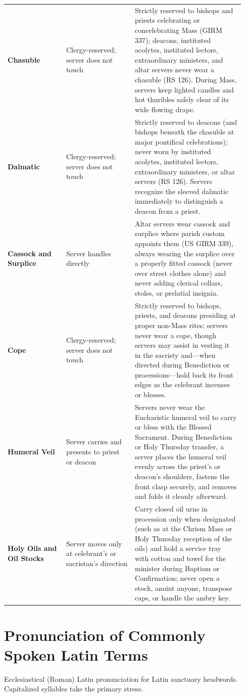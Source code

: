 {\begin{longtable}{>{\raggedright\arraybackslash}p{0.23\linewidth}>{\raggedright\arraybackslash}p{0.27\linewidth}>{\raggedright\arraybackslash}p{0.43\linewidth}}
\textbf{Chasuble} & Clergy-reserved; server does not touch & Strictly reserved to bishops and priests celebrating or concelebrating Mass (GIRM 337); deacons, instituted acolytes, instituted lectors, extraordinary ministers, and altar servers never wear a chasuble (RS 126). During Mass, servers keep lighted candles and hot thuribles safely clear of its wide flowing drape. \\
\textbf{Dalmatic} & Clergy-reserved; server does not touch & Strictly reserved to deacons (and bishops beneath the chasuble at major pontifical celebrations); never worn by instituted acolytes, instituted lectors, extraordinary ministers, or altar servers (RS 126). Servers recognize the sleeved dalmatic immediately to distinguish a deacon from a priest. \\
\textbf{Cassock and Surplice} & Server handles directly & Altar servers wear cassock and surplice where parish custom appoints them (US GIRM 339), always wearing the surplice over a properly fitted cassock (never over street clothes alone) and never adding clerical collars, stoles, or prelatial insignia. \\
\textbf{Cope} & Clergy-reserved; server does not touch & Strictly reserved to bishops, priests, and deacons presiding at proper non-Mass rites; servers never wear a cope, though servers may assist in vesting it in the sacristy and---when directed during Benediction or processions---hold back its front edges as the celebrant incenses or blesses. \\
\textbf{Humeral Veil} & Server carries and presents to priest or deacon & Servers never wear the Eucharistic humeral veil to carry or bless with the Blessed Sacrament. During Benediction or Holy Thursday transfer, a server places the humeral veil evenly across the priest's or deacon's shoulders, fastens the front clasp securely, and removes and folds it cleanly afterward. \\
\textbf{Holy Oils and Oil Stocks} & Server moves only at celebrant's or sacristan's direction & Carry closed oil urns in procession only when designated (such as at the Chrism Mass or Holy Thursday reception of the oils) and hold a service tray with cotton and towel for the minister during Baptism or Confirmation; never open a stock, anoint anyone, transpose caps, or handle the ambry key. \\
\bottomrule
\end{longtable}}

\clearpage
\section{Pronunciation of Commonly Spoken Latin Terms}
Ecclesiastical (Roman) Latin pronunciation for Latin sanctuary headwords. Capitalized syllables take the primary stress.

